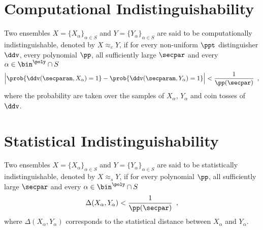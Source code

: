 
\section{Computational Indistinguishability}

\begin{definition}
	Two ensembles $X=\{X_\alpha\}_{\alpha \in S}$ and $Y=\{Y_\alpha\}_{\alpha \in S}$ are said to be computationally indistinguishable, denoted by $X \approx_c Y$, if for every non-uniform $\ppt$ distinguisher $\ddv$, every polynomial $\pp$, all sufficiently large $\secpar$ and every $\alpha \in \bin^{\poly} \cap S$
	\[
		\Big| \prob{\ddv(\secparam,X_\alpha)=1} - \prob{\ddv(\secparam,Y_\alpha)=1} \Big| < \frac{1}{\pp(\secpar)}\enspace,
	\]
	where the probability are taken over the samples of $X_\alpha$, $Y_\alpha$ and coin tosses of $\ddv$.
\end{definition}


\section{Statistical Indistinguishability}

\begin{definition}
	Two ensembles $X=\{X_\alpha\}_{\alpha \in S}$ and $Y=\{Y_\alpha\}_{\alpha \in S}$ are said to be statistically indistinguishable, denoted by ${X \approx_s Y}$, if for every polynomial $\pp$, all sufficiently large $\secpar$ and every $\alpha \in \bin^{\poly} \cap S$
	\[ 
	 \Delta(X_\alpha,Y_\alpha) < \frac{1}{\pp(\secpar)}\enspace,
	\] 
	where $\Delta(X_\alpha,Y_\alpha)$ corresponds to the statistical distance between $X_\alpha$ and $Y_\alpha$.
\end{definition}

